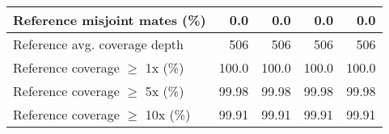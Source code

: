 \documentclass[12pt,a4paper]{article}
\begin{document}
\begin{table}[ht]
\begin{center}
\begin{tabular}{|l*{4}{|r}|}
Reference misjoint mates (\%) & 0.0 & 0.0 & 0.0 & 0.0 \\ \hline
Reference avg. coverage depth & 506 & 506 & 506 & 506 \\ \hline
Reference coverage $\geq$ 1x (\%) & 100.0 & 100.0 & 100.0 & 100.0 \\ \hline
Reference coverage $\geq$ 5x (\%) & 99.98 & 99.98 & 99.98 & 99.98 \\ \hline
Reference coverage $\geq$ 10x (\%) & 99.91 & 99.91 & 99.91 & 99.91 \\ \hline
\end{tabular}
\end{center}
\end{table}
\end{document}
